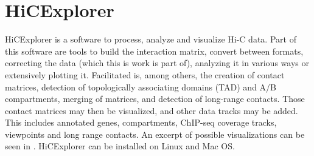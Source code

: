 %
%
%
%
%
%





\section{HiCExplorer}\label{sec:hicexplorer}

HiCExplorer \cite{wolff2018galaxy} is a software to process, analyze and
visualize Hi-C data. Part of this software are tools to build the interaction
matrix, convert between formats, correcting the data (which this is work is
part of), analyzing it in various ways or extensively plotting it.
Facilitated is, among others, the creation of contact matrices, detection of
topologically associating domains (TAD) and A/B compartments, merging of
matrices, and detection of long-range contacts\footnotemark. Those contact
matrices may then be visualized, and other data tracks may be added. This 
includes annotated genes, compartments, ChIP-seq coverage tracks, viewpoints
and long range contacts\footnotemark[\value{footnote}]. An excerpt of possible
visualizations can be seen in . HiCExplorer can be
installed on Linux and Mac OS.


